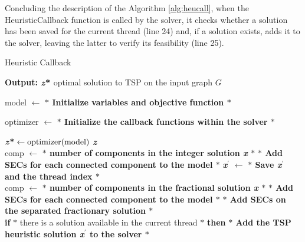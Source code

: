Concluding the description of the Algorithm \ref{alg:heucall}, when the HeuristicCallback function is called by the solver, it checks whether a solution has been saved for the current thread (line 24) and, if a solution exists, adds it to the solver, leaving the latter to verify its feasibility (line 25).

\begin{algorithm}
    \caption{Heuristic Callback}\label{Heuristic Callback}
    \hspace*{\algorithmicindent} \textbf{Output:} $\textbf{\textit{z}\text{*}} $ optimal solution to TSP on the input graph $G$
    \begin{algorithmic}[1]
  \State model $ \leftarrow $ \textbf{$\ast$ Initialize variables and objective function $\ast$ }
  
  \State optimizer $ \leftarrow $ \textbf{$\ast$ Initialize the callback functions within the solver $\ast$ }
    	\end{algorithmic}
	\label{alg:heucall}
   	\end{algorithm}
	\vspace{1cm}
	\begin{algorithm}                     
   	 \begin{algorithmic} [1]              
  \State $\textbf{\textit{z}\text{*}} \gets \text{optimizer(model)}$
  \State \Return \textbf{\textit{z}\text{*}}
\EndFunction
\\
  \State comp $ \leftarrow $ \textbf{$\ast$ number of components in the integer solution \textit{x} $\ast$ }
	\State \textbf{$\ast$ Add SECs for each connected component to the model $\ast$ }
	\State \textbf{\textit{x}$^{\prime}$} $ \leftarrow $ 
	\State \textbf{$\ast$ Save \textbf{\textit{x}$^{\prime}$} and the thread index $\ast$ }
	\EndIf  
	\State \Return 
	\EndFunction
	\\
  \State comp $ \leftarrow $ \textbf{$\ast$ number of components in the fractional solution \textit{x} $\ast$ }
	\State \textbf{$\ast$ Add SECs for each connected component to the model $\ast$ }
	\EndIf
	\State \textbf{$\ast$ Add SECs on the separated fractionary solution $\ast$ }
	\EndIf 
	\State \Return 
	\EndFunction
	\\
	\State \textbf{if} $\ast$ there is a solution available in the current thread $\ast$ \textbf{then}
	\State \textbf{$\ast$ Add the TSP heuristic solution \textbf{\textit{x}$^{\prime}$} to the solver $\ast$ }
	\State \Return 
	\EndFunction

    \end{algorithmic}
    
    \end{algorithm}
    
